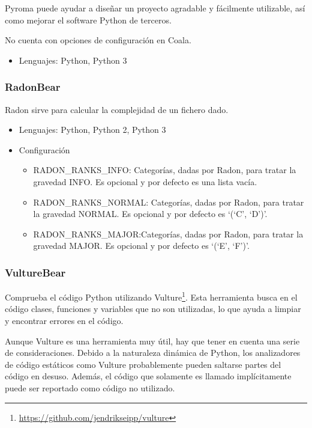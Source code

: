 \documentclass[a4paper, 12pt]{book}
\begin{document}
Pyroma puede ayudar a diseñar un proyecto agradable y fácilmente utilizable, así como mejorar el software Python de terceros.

No cuenta con opciones de configuración en Coala.

\begin{itemize}
  \item Lenguajes: Python, Python 3
\end{itemize}

\subsubsection{RadonBear}
\label{sec:seccion1.2.14}
Radon sirve para calcular la complejidad de un fichero dado.

\begin{itemize}
  \item Lenguajes: Python, Python 2, Python 3
  \item Configuración
    \begin{itemize}
          \item RADON\_RANKS\_INFO: Categorías, dadas por Radon, para tratar la gravedad INFO. Es opcional y por defecto es una lista vacía.
          \item RADON\_RANKS\_NORMAL: Categorías, dadas por Radon, para tratar la gravedad NORMAL. Es opcional y por defecto es `(`C', `D')'.
          \item RADON\_RANKS\_MAJOR:Categorías, dadas por Radon, para tratar la gravedad MAJOR. Es opcional y por defecto es `(`E', `F')'.
    \end{itemize}
\end{itemize}

\subsubsection{VultureBear}
\label{sec:seccion1.2.15}
Comprueba el código Python utilizando Vulture\footnote{\url{https://github.com/jendrikseipp/vulture}}. Esta herramienta busca en el código clases, funciones y variables que no son utilizadas, lo que ayuda a limpiar y encontrar errores en el código.

Aunque Vulture es una herramienta muy útil, hay que tener en cuenta una serie de consideraciones. Debido a la naturaleza dinámica de Python, los analizadores de código estáticos como Vulture probablemente pueden saltarse partes del código en desuso. Además, el código que solamente es llamado implícitamente puede ser reportado como código no utilizado.
\end{document}
